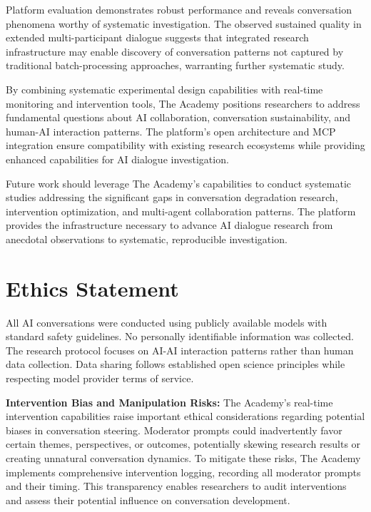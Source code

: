 \documentclass[11pt,letterpaper]{article}
\newcommand{\theacademy}{The Academy}
\newcommand{\mcp}{MCP}
\begin{document}
Platform evaluation demonstrates robust performance and reveals conversation phenomena worthy of systematic investigation. The observed sustained quality in extended multi-participant dialogue suggests that integrated research infrastructure may enable discovery of conversation patterns not captured by traditional batch-processing approaches, warranting further systematic study.

By combining systematic experimental design capabilities with real-time monitoring and intervention tools, \theacademy{} positions researchers to address fundamental questions about AI collaboration, conversation sustainability, and human-AI interaction patterns. The platform's open architecture and \mcp{} integration ensure compatibility with existing research ecosystems while providing enhanced capabilities for AI dialogue investigation.

Future work should leverage \theacademy{}'s capabilities to conduct systematic studies addressing the significant gaps in conversation degradation research, intervention optimization, and multi-agent collaboration patterns. The platform provides the infrastructure necessary to advance AI dialogue research from anecdotal observations to systematic, reproducible investigation.

\section*{Ethics Statement}

All AI conversations were conducted using publicly available models with standard safety guidelines. No personally identifiable information was collected. The research protocol focuses on AI-AI interaction patterns rather than human data collection. Data sharing follows established open science principles while respecting model provider terms of service.

\textbf{Intervention Bias and Manipulation Risks:} The Academy's real-time intervention capabilities raise important ethical considerations regarding potential biases in conversation steering. Moderator prompts could inadvertently favor certain themes, perspectives, or outcomes, potentially skewing research results or creating unnatural conversation dynamics. To mitigate these risks, The Academy implements comprehensive intervention logging, recording all moderator prompts and their timing. This transparency enables researchers to audit interventions and assess their potential influence on conversation development.
\end{document}
